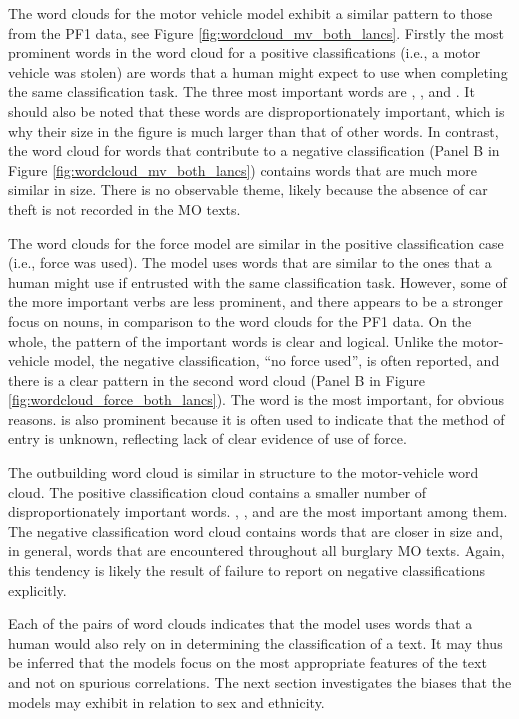 The word clouds for the motor vehicle model exhibit a similar pattern to those from the PF1 data, see Figure \ref{fig:wordcloud_mv_both_lancs}. Firstly the most prominent words in the word cloud for a positive classifications (i.e., a motor vehicle was stolen) are words that a human might expect to use when completing the same classification task. The three most important words are , , and . It should also be noted that these words are disproportionately important, which is why their size in the figure is much larger than that of other words. In contrast, the word cloud for words that contribute to a negative classification (Panel B in Figure \ref{fig:wordcloud_mv_both_lancs}) contains words that are much more similar in size. There is no observable theme, likely because the absence of car theft is not recorded in the MO texts.


The word clouds for the force model are similar in the positive classification case (i.e., force was used). The model uses words that are similar to the ones that a human might use if entrusted with the same classification task. However, some of the more important verbs are less prominent, and there appears to be a stronger focus on nouns, in comparison to the word clouds for the PF1 data. On the whole, the pattern of the important words is clear and logical. Unlike the motor-vehicle model, the negative classification, “no force used”, is often reported, and there is a clear pattern in the second word cloud (Panel B in Figure \ref{fig:wordcloud_force_both_lancs}).  The word  is the most important, for obvious reasons.  is also prominent because it is often used to indicate that the method of entry is unknown, reflecting lack of clear evidence of use of force. 

The outbuilding word cloud is similar in structure to the motor-vehicle word cloud. The positive classification cloud contains a smaller number of disproportionately important words. , , and  are the most important among them. The negative classification word cloud contains words that are closer in size and, in general, words that are encountered throughout all burglary MO texts. Again, this tendency is likely the result of failure to report on negative classifications explicitly.

Each of the pairs of word clouds indicates that the model uses words that a human would also rely on in determining the classification of a text. It may thus be inferred that the models focus on the most appropriate features of the text and not on spurious correlations. The next section investigates the biases that the models may exhibit in relation to sex and ethnicity.

